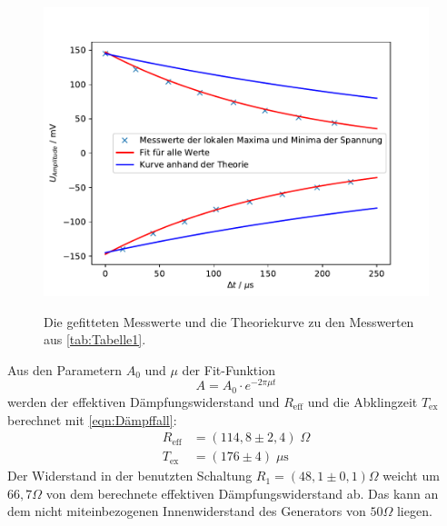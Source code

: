\documentclass[titlepage = firstcover]{scrartcl}
\begin{document}
            \begin{figure}[h]
                \centering
                \caption{Die gefitteten Messwerte und die Theoriekurve zu den Messwerten aus \ref{tab:Tabelle1}.}
                \includegraphics[width = 0.7\linewidth]{Spannungsamplituden.pdf}
                \label{fig:Spannungsamplituden}
            \end{figure}
            \FloatBarrier
            \noindent
            Aus den Parametern $A_0$ und $\mu$ der Fit-Funktion
            \begin{equation*}
                A = A_0 \cdot e^{-2 \pi \mu t}
            \end{equation*}
            werden der effektiven Dämpfungswiderstand und $R_\text{eff}$ und die Abklingzeit $T_\text{ex}$ berechnet mit \eqref{eqn:Dämpffall}:
            \begin{align}
                R_\text{eff} &= (114,8 \pm 2,4) \; \Omega \\
                T_\text{ex} &= (176 \pm 4) \; \mu \text{s}
            \end{align}
            Der Widerstand in der benutzten Schaltung $R_1 = (48,1 \pm 0,1) \Omega$ weicht um $66,7 \Omega$ von dem berechnete effektiven Dämpfungswiderstand
            ab. Das kann an dem nicht miteinbezogenen Innenwiderstand des Generators von $50 \Omega$ liegen.
\end{document}

